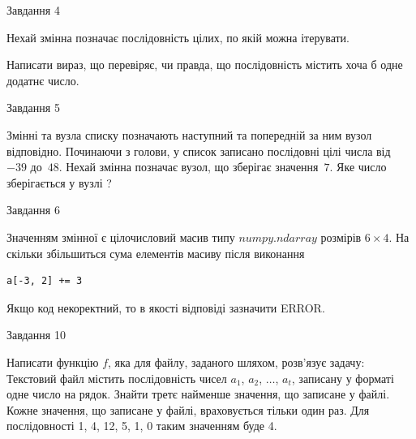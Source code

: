 \documentclass[12pt, ukrainian]{article}
\begin{document}
{\begin{minipage}[t]{8.0cm}
\end{minipage}


               
{\begin{center}Завдання {4}\end{center}}
\vspace{-4mm}
Нехай змінна  позначає послідовність цілих, по якій можна ітерувати.

Написати вираз, що перевіряє, чи правда, що послідовність  містить хоча б одне додатнє число.\par

\vspace{10mm}
               
{\begin{center}Завдання {5}\end{center}}
\vspace{-4mm}
Змінні  та  вузла списку позначають наступний та попередній за ним вузол відповідно. Починаючи з голови, у список записано послідовні цілі числа від~$-39$ до~$48$. Нехай змінна  позначає вузол, що зберігає значення~$7$.
Яке число зберігається у вузлі  ?\par

               
{\begin{center}Завдання {6}\end{center}}
\vspace{-4mm}
Значенням змінної  є цілочисловий масив типу $numpy.ndarray$ розмірів $6{\times}4$. На скільки збільшиться сума елементів масиву  після виконання
\begin{verbatim}
a[-3, 2] += 3
\end{verbatim}


Якщо код некоректний, то в якості відповіді зазначити ERROR.\par

               
{\begin{center}Завдання {10}\end{center}}
\vspace{-4mm}

Написати функцію $f$, яка для файлу, заданого шляхом, розв’язує задачу:\\ Текстовий файл містить послідовність чисел $a_1$, $a_2$, $\ldots$, $a_t$, записану у форматі одне число на рядок. Знайти третє найменше значення, що записане у файлі. Кожне значення, що записане у файлі, враховується тільки один раз. Для послідовності 1, 4, 12, 5, 1, 0 таким значенням буде 4.

}
\end{document}
